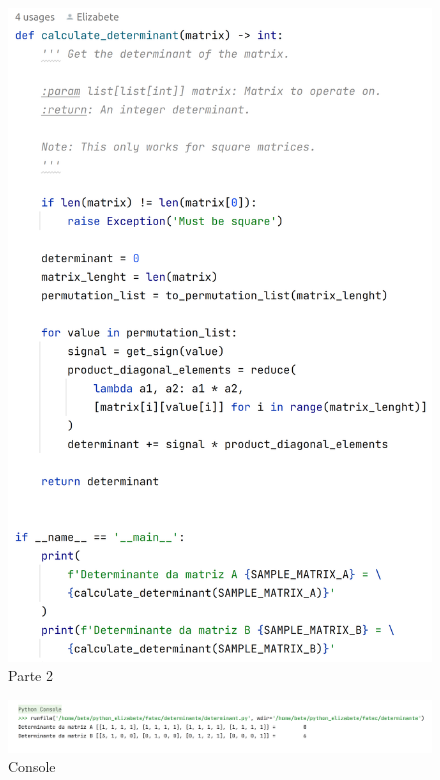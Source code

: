\documentclass[a4paper,12pt]{article}
\begin{document}
\begin{figure}[h!]
\centering
\includegraphics[width=12cm]{code_02.png}
\caption{Parte 2}
\label{Rótulo}
\end{figure}

\begin{figure}[h!]
\centering
\includegraphics[width=18cm]{console.png}
\caption{Console}
\label{Rótulo}
\end{figure}
\end{document}
